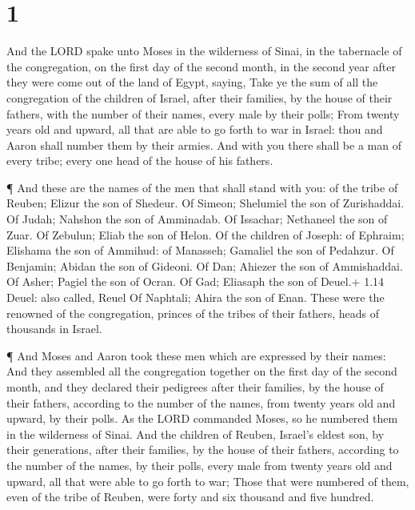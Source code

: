 \hypertarget{section}{%
\section{1}\label{section}}

 And the LORD spake unto Moses in the wilderness of Sinai,
in the tabernacle of the congregation, on the first day of the second
month, in the second year after they were come out of the land of Egypt,
saying,  Take ye the sum of all the congregation of the
children of Israel, after their families, by the house of their fathers,
with the number of their names, every male by their polls; 
From twenty years old and upward, all that are able to go forth to war
in Israel: thou and Aaron shall number them by their armies.
 And with you there shall be a man of every tribe; every one
head of the house of his fathers.

 ¶ And these are the names of the men that shall stand with
you: of the tribe of Reuben; Elizur the son of Shedeur.  Of
Simeon; Shelumiel the son of Zurishaddai.  Of Judah; Nahshon
the son of Amminadab.  Of Issachar; Nethaneel the son of
Zuar.  Of Zebulun; Eliab the son of Helon.  Of
the children of Joseph: of Ephraim; Elishama the son of Ammihud: of
Manasseh; Gamaliel the son of Pedahzur.  Of Benjamin;
Abidan the son of Gideoni.  Of Dan; Ahiezer the son of
Ammishaddai.  Of Asher; Pagiel the son of Ocran.
 Of Gad; Eliasaph the son of Deuel.+ 1.14 Deuel: also
called, Reuel  Of Naphtali; Ahira the son of Enan.
 These were the renowned of the congregation, princes of
the tribes of their fathers, heads of thousands in Israel.

 ¶ And Moses and Aaron took these men which are expressed
by their names:  And they assembled all the congregation
together on the first day of the second month, and they declared their
pedigrees after their families, by the house of their fathers, according
to the number of the names, from twenty years old and upward, by their
polls.  As the LORD commanded Moses, so he numbered them in
the wilderness of Sinai.  And the children of Reuben,
Israel's eldest son, by their generations, after their families, by the
house of their fathers, according to the number of the names, by their
polls, every male from twenty years old and upward, all that were able
to go forth to war;  Those that were numbered of them, even
of the tribe of Reuben, were forty and six thousand and five hundred.

